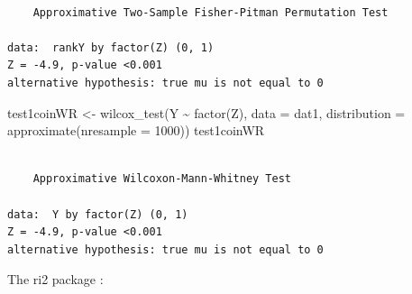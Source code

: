 \documentclass[
  12pt,
]{book}
\newenvironment{Shaded}{\begin{snugshade}}{\end{snugshade}}
\newcommand{\AttributeTok}[1]{\textcolor[rgb]{0.77,0.63,0.00}{#1}}
\newcommand{\DecValTok}[1]{\textcolor[rgb]{0.00,0.00,0.81}{#1}}
\newcommand{\DocumentationTok}[1]{\textcolor[rgb]{0.56,0.35,0.01}{\textbf{\textit{#1}}}}
\newcommand{\FunctionTok}[1]{\textcolor[rgb]{0.00,0.00,0.00}{#1}}
\newcommand{\NormalTok}[1]{#1}
\newcommand{\OtherTok}[1]{\textcolor[rgb]{0.56,0.35,0.01}{#1}}
\newcommand{\SpecialCharTok}[1]{\textcolor[rgb]{0.00,0.00,0.00}{#1}}
\theoremstyle{definition}
\theoremstyle{definition}
\theoremstyle{definition}
\theoremstyle{remark}
\begin{document}
\begin{verbatim}

    Approximative Two-Sample Fisher-Pitman Permutation Test

data:  rankY by factor(Z) (0, 1)
Z = -4.9, p-value <0.001
alternative hypothesis: true mu is not equal to 0
\end{verbatim}

\begin{Shaded}
\begin{Highlighting}[]
\NormalTok{test1coinWR }\OtherTok{\textless{}{-}} \FunctionTok{wilcox\_test}\NormalTok{(Y }\SpecialCharTok{\textasciitilde{}} \FunctionTok{factor}\NormalTok{(Z), }\AttributeTok{data =}\NormalTok{ dat1, }\AttributeTok{distribution =} \FunctionTok{approximate}\NormalTok{(}\AttributeTok{nresample =} \DecValTok{1000}\NormalTok{))}
\NormalTok{test1coinWR}
\end{Highlighting}
\end{Shaded}

\begin{verbatim}

    Approximative Wilcoxon-Mann-Whitney Test

data:  Y by factor(Z) (0, 1)
Z = -4.9, p-value <0.001
alternative hypothesis: true mu is not equal to 0
\end{verbatim}

The ri2 package \citep{R-ri2}:

\begin{Shaded}
\end{Shaded}
\end{document}

